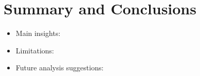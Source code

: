 \documentclass[10pt]{article}
\begin{document}
\section{Summary and Conclusions}
\begin{itemize}
    \item Main insights:
    \item Limitations:
    \item Future analysis suggestions:
\end{itemize}

\end{document}
